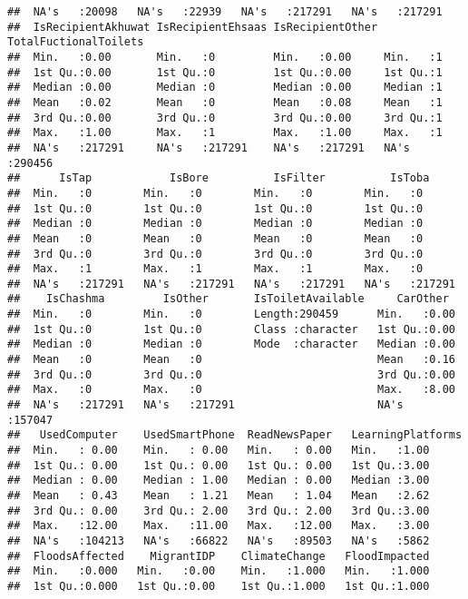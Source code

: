 \documentclass[
]{article}
\begin{document}
\begin{verbatim}
##  NA's   :20098   NA's   :22939   NA's   :217291   NA's   :217291  
##  IsRecipientAkhuwat IsRecipientEhsaas IsRecipientOther TotalFuctionalToilets
##  Min.   :0.00       Min.   :0         Min.   :0.00     Min.   :1            
##  1st Qu.:0.00       1st Qu.:0         1st Qu.:0.00     1st Qu.:1            
##  Median :0.00       Median :0         Median :0.00     Median :1            
##  Mean   :0.02       Mean   :0         Mean   :0.08     Mean   :1            
##  3rd Qu.:0.00       3rd Qu.:0         3rd Qu.:0.00     3rd Qu.:1            
##  Max.   :1.00       Max.   :1         Max.   :1.00     Max.   :1            
##  NA's   :217291     NA's   :217291    NA's   :217291   NA's   :290456       
##      IsTap            IsBore          IsFilter          IsToba      
##  Min.   :0        Min.   :0        Min.   :0        Min.   :0       
##  1st Qu.:0        1st Qu.:0        1st Qu.:0        1st Qu.:0       
##  Median :0        Median :0        Median :0        Median :0       
##  Mean   :0        Mean   :0        Mean   :0        Mean   :0       
##  3rd Qu.:0        3rd Qu.:0        3rd Qu.:0        3rd Qu.:0       
##  Max.   :1        Max.   :1        Max.   :1        Max.   :0       
##  NA's   :217291   NA's   :217291   NA's   :217291   NA's   :217291  
##    IsChashma         IsOther       IsToiletAvailable     CarOther     
##  Min.   :0        Min.   :0        Length:290459      Min.   :0.00    
##  1st Qu.:0        1st Qu.:0        Class :character   1st Qu.:0.00    
##  Median :0        Median :0        Mode  :character   Median :0.00    
##  Mean   :0        Mean   :0                           Mean   :0.16    
##  3rd Qu.:0        3rd Qu.:0                           3rd Qu.:0.00    
##  Max.   :0        Max.   :0                           Max.   :8.00    
##  NA's   :217291   NA's   :217291                      NA's   :157047  
##   UsedComputer    UsedSmartPhone  ReadNewsPaper   LearningPlatforms
##  Min.   : 0.00    Min.   : 0.00   Min.   : 0.00   Min.   :1.00     
##  1st Qu.: 0.00    1st Qu.: 0.00   1st Qu.: 0.00   1st Qu.:3.00     
##  Median : 0.00    Median : 1.00   Median : 0.00   Median :3.00     
##  Mean   : 0.43    Mean   : 1.21   Mean   : 1.04   Mean   :2.62     
##  3rd Qu.: 0.00    3rd Qu.: 2.00   3rd Qu.: 2.00   3rd Qu.:3.00     
##  Max.   :12.00    Max.   :11.00   Max.   :12.00   Max.   :3.00     
##  NA's   :104213   NA's   :66822   NA's   :89503   NA's   :5862     
##  FloodsAffected    MigrantIDP    ClimateChange   FloodImpacted  
##  Min.   :0.000   Min.   :0.00    Min.   :1.000   Min.   :1.000  
##  1st Qu.:0.000   1st Qu.:0.00    1st Qu.:1.000   1st Qu.:1.000  

\end{verbatim}
\end{document}
